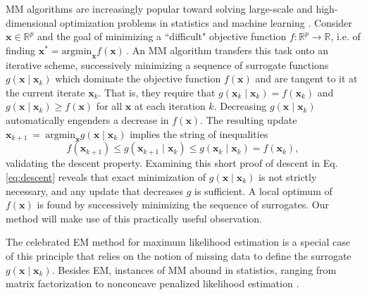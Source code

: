 \documentclass{statsoc}
\newcommand{\bx}{\boldsymbol{x}}
\begin{document}
MM algorithms are increasingly popular toward  solving large-scale and high-dimensional optimization problems in statistics and machine learning \citep{lange2008mm, zhou2015novel,xu2019power}.
Consider $\bx \in \mathbb{R}^p$ and the goal of minimizing a ``difficult" objective function $f: \mathbb{R}^p \to \mathbb{R}$, i.e. of finding
$\displaystyle \bx^\ast = \text{argmin}_{\bx} f(\bx)\,. $ 
An MM algorithm transfers this task onto an iterative scheme, successively minimizing a sequence of surrogate functions $g(\bx \mid \bx_k)$ which dominate the objective function $f(\bx)$ and are tangent to it at the current iterate  $\bx_k$. %
That is, they require  that $g(\bx_k \mid \bx_k) = f(\bx_k)$ and $g(\bx \mid \bx_k)  \geq f(\bx)$ for all $\bx$ at each iteration $k$. Decreasing $g(\bx \mid \bx_k)$  automatically engenders a decrease in $f(\bx)$.   The resulting update $\bx_{k+1}~=~\text{argmin}_{\bx} g(\bx \mid \bx_k)$ implies the string of inequalities
\begin{equation}\label{eq:descent}
  f(\bx_{k+1}) \leq g(\bx_{k+1} \mid \bx_{k}) \leq g(\bx_{k} \mid \bx_{k}) = f(\bx_{k}),
\end{equation}
validating the descent property. Examining this short proof of descent in Eq.\eqref{eq:descent} reveals that exact minimization of $g(\bx \mid \bx_k)$ is not strictly necessary, and any update that decreases $g$ is sufficient. A local optimum of $f(\bx)$ is found by successively minimizing the sequence of surrogates.   Our method will make use of this practically useful observation. 



The celebrated EM method for maximum likelihood estimation is a special case of this principle that relies on the notion of missing data to define the surrogate $g(\bx \mid \bx_k)$. Besides EM, instances of MM abound in statistics, ranging from matrix factorization \citep{lee1999learning} to nonconcave penalized likelihood estimation \citep{zou2008one}. 
\end{document}
